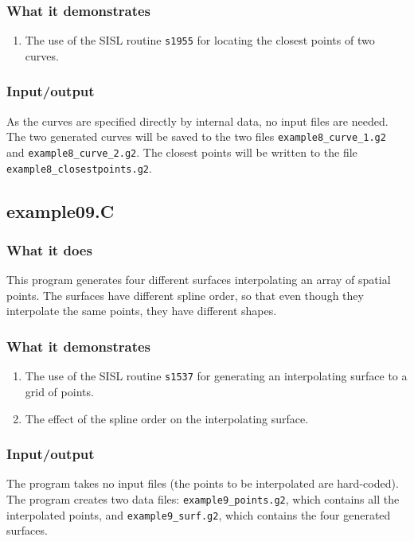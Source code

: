 \subsubsection{What it demonstrates}
\begin{enumerate}
\item The use of the SISL routine \verb/s1955/ for locating the closest points of two curves.
\end{enumerate}
\subsubsection{Input/output}
As the curves are specified directly by internal data, no input files are needed.\\
The two generated curves will be saved to the two files \verb/example8_curve_1.g2/ and 
\verb/example8_curve_2.g2/.  The closest points will be written to the file \\
\verb/example8_closestpoints.g2/.

\subsection{example09.C}

\subsubsection{What it does}
This program generates four different surfaces interpolating an array of spatial points.  
The surfaces have different spline order, so that even though they interpolate the same 
points, they have different shapes.
\subsubsection{What it demonstrates}
\begin{enumerate}
\item The use of the SISL routine \verb/s1537/ for generating an interpolating surface to a grid
of points.
\item The effect of the spline order on the interpolating surface.
\end{enumerate}
\subsubsection{Input/output}
The program takes no input files (the points to be interpolated are hard-coded). \\
The program creates two data files: \verb/example9_points.g2/, which contains all the 
interpolated points, and \verb/example9_surf.g2/, which contains the four generated
surfaces.

